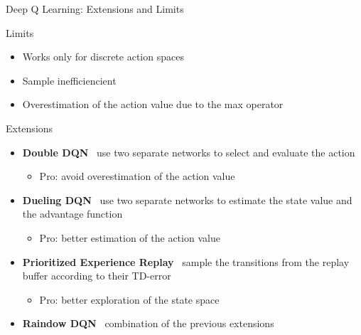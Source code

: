 \documentclass[presentation, 9pt]{beamer}\mode<presentation>{\usetheme{AMSBolognaFC}}
\begin{document}
\begin{frame}{Deep Q Learning: Extensions and Limits}
	\begin{block}{Limits}
		\begin{itemize}
			\item Works only for discrete action spaces
			\item Sample inefficiencient
			\item Overestimation of the action value due to the max operator
		\end{itemize}
	\end{block}
	\begin{block}{Extensions}
		\begin{itemize}
			\item \textbf{Double DQN} \faArrowRight \, use two separate networks to select and evaluate the action
			\begin{itemize}
				\item Pro: avoid overestimation of the action value
			\end{itemize}
			\item \textbf{Dueling DQN} \faArrowRight \, use two separate networks to estimate the state value and the advantage function
			\begin{itemize}
				\item Pro: better estimation of the action value
			\end{itemize}
			\item \textbf{Prioritized Experience Replay} \faArrowRight \, sample the transitions from the replay buffer according to their TD-error
			\begin{itemize}
				\item Pro: better exploration of the state space
			\end{itemize}
			\item \textbf{Raindow DQN} \faArrowRight \, combination of the previous extensions
		\end{itemize}
	\end{block}

\end{frame}
\end{document}
